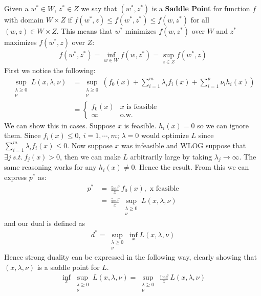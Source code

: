 \documentclass[]{article}
\theoremstyle{mattstyle}
\theoremstyle{definition}
\begin{document}
Given a $w^*\in W$, $z^*\in Z$ we say that $(w^*,z^*)$ is a \textbf{Saddle Point} for function $f$ with domain $W \times Z$ if $f(w^*, z) \le f(w^*, z^*) \le f(w, z^*)$ for all $(w,z) \in W \times Z$. This means that $w^*$ minimizes $f(w, z^*)$ over $W$ and $z^*$ maximizes $f(w^*, z)$ over $Z$:
\begin{align*}
f(w^*, z^*) = \inf_{w \in W} f(w, z^*) = \sup_{z \in Z} f(w^*, z)
\end{align*}
First we notice the following:
\begin{align*}
\sup\limits_{\substack{\lambda\ge0 \\ \nu}} L(x, \lambda, \nu) &= \sup\limits_{\substack{\lambda\ge0 \\ \nu}} \left( f_0(x) + \sum_{i=1}^m \lambda_if_i(x) + \sum_{i=1}^p \nu_i h_i(x) \right)\\
&= \begin{cases}
f_0(x) & \text{$x$ is feasible}\\
\infty & \text{o.w.}
\end{cases}
\end{align*}
We can show this in cases. Suppose $x$ is feasible. $h_i(x)=0$ so we can ignore them. Since $f_i(x) \le 0,\ i=1, \cdots, m$; $\lambda = 0$ would optimize $L$ since $\sum_{i=1}^m \lambda_if_i(x) \le 0$. Now suppose $x$ was infeasible and WLOG suppose that $ \exists j \ s.t.\ f_j(x) > 0$, then we can make $L$ arbitrarily large by taking $\lambda_j \rightarrow \infty$. The same reasoning works for any $h_i(x) \ne 0$. Hence the result. From this we can express $p^*$ as:
\begin{align*}
p^* &= \inf_x f_0(x), \text{  x feasible}\\
&= \inf_x\sup_{\substack{\lambda\ge0 \\ \nu}}L(x, \lambda, \nu)
\end{align*}
and our dual is defined as
\begin{align*}
d^* = \sup_{\substack{\lambda\ge0 \\ \nu}}\inf_x L(x, \lambda, \nu)
\end{align*}
Hence strong duality can be expressed in the following way, clearly showing that $(x, \lambda, \nu)$ is a saddle point for $L$.
\begin{align*}
\inf_x\sup_{\substack{\lambda\ge0 \\ \nu}}L(x, \lambda, \nu) = \sup_{\substack{\lambda\ge0 \\ \nu}}\inf_x L(x, \lambda, \nu)
\end{align*}
\end{document}
